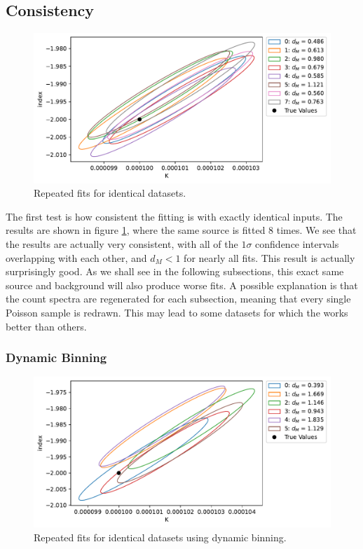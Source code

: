 \documentclass{article}
\begin{document}
\subsection{Consistency}

\begin{figure}[h]
    \centering
    \includegraphics[width=\textwidth]{Images/t_identical_sim_source_sb.pdf}
    \caption{Repeated fits for identical datasets.}
    \label{fig ident}
\end{figure}

The first test is how consistent the fitting is with exactly identical inputs. The results are shown in figure \ref{fig ident}, where the same source is fitted 8 times. We see that the results are actually very consistent, with all of the $1\sigma$ confidence intervals overlapping with each other, and $d_M<1$ for nearly all fits. This result is actually surprisingly good. As we shall see in the following subsections, this exact same source and background will also produce worse fits. A possible explanation is that the count spectra are regenerated for each subsection, meaning that every single Poisson sample is redrawn. This may lead to some datasets for which the works better than others. 

\FloatBarrier

\subsubsection{Dynamic Binning}

\begin{figure}[h]
    \centering
    \includegraphics[width=\textwidth]{Images/identical_sim_source_db.pdf}
    \caption{Repeated fits for identical datasets using dynamic binning.}
    \label{fig ident db}
\end{figure}
\end{document}
